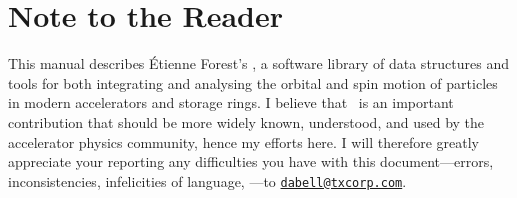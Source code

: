 
\chapter{Note to the Reader}

This manual describes \'Etienne Forest's \PTC, a software library
of data structures and tools for both integrating and analysing the
orbital and spin motion of particles in modern accelerators and
storage rings. I believe that \PTC\ is an important contribution
that should be more widely known, understood, and used by the
accelerator physics community, hence my efforts here. I will
therefore greatly appreciate your reporting any difficulties you
have with this document---errors, inconsistencies, infelicities of
language, \etc---to
\href{mailto:dabell@txcorp.com}{\nolinkurl{dabell@txcorp.com}}.

\endinput
